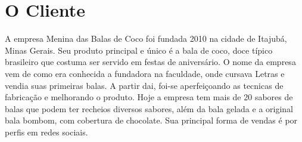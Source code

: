 \section{O Cliente}

A empresa Menina das Balas de Coco foi fundada 2010 na cidade de Itajubá, Minas Gerais. Seu produto principal e único é a bala de coco, doce típico brasileiro que costuma ser servido em festas de aniversário. O nome da empresa vem de como era conhecida a fundadora na faculdade, onde cursava Letras e vendia suas primeiras balas. A partir dai, foi-se aperfeiçoando as tecnicas de fabricação e melhorando o produto. Hoje a empresa tem mais de 20 sabores de balas que podem ter recheios diversos sabores, além da bala gelada e a original bala bombom, com cobertura de chocolate. Sua principal forma de vendas é por perfis em redes sociais.

